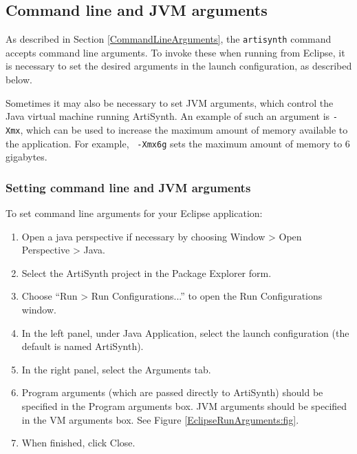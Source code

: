 \subsection{Command line and JVM arguments}
\label{EclipseCommandArguments}

As described in Section \ref{CommandLineArguments}, the {\tt artisynth}
command accepts command line arguments. To invoke these when
running from Eclipse, it is necessary to set the desired arguments in
the launch configuration, as described below. 

Sometimes it may also be necessary to set JVM arguments, which control
the Java virtual machine running ArtiSynth.  An example of such an
argument is {\tt -Xmx}, which can be used to increase the maximum
amount of memory available to the application.  For example, {\tt
-Xmx6g} sets the maximum amount of memory to 6 gigabytes.

\subsubsection {Setting command line and JVM arguments}
\label{SettingCommandLineArguments}

To set command line arguments for your Eclipse application:

\begin{enumerate}

\item Open a java perspective if necessary by choosing
  {\sf Window > Open Perspective > Java}.

\item Select the ArtiSynth project in the {\sf Package Explorer} form.

\item Choose ``{\sf Run > Run Configurations...}'' to open the {\sf Run
  Configurations} window.

\item In the left panel, under {\sf Java Application}, select
the launch configuration (the default is named {\sf ArtiSynth}).

\item In the right panel, select the {\sf Arguments} tab.

\item Program arguments (which are passed directly to ArtiSynth)
should be specified in the {\sf Program arguments} box.  JVM arguments
should be specified in the {\sf VM arguments} box. See Figure
\ref{EclipseRunArguments:fig}.

\item When finished, click {\sf Close}.

\end{enumerate}

